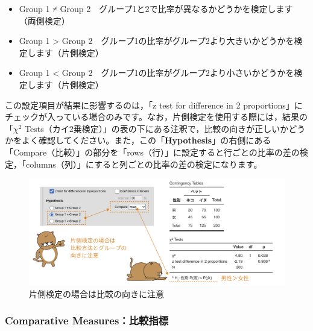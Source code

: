 \documentclass[
  12pt,
  a5jpaper,
  lualatex, ja=standard]{bxjsbook}
\providecommand{\tightlist}{%
  \setlength{\itemsep}{0pt}\setlength{\parskip}{0pt}}
\newenvironment{jmvsettings}{%
	\begin{center}%
	\begin{tcolorbox}[%
		title=設定項目,
		colframe=gmoji,
		colbacktitle=gmoji,
		colback=gmoji!2!white,
		breakable,
		width=.9\textwidth,
		]\small\addtolength{\leftmargini}{-3\labelsep}%
	}%
	{\end{tcolorbox}\end{center}}
\begin{document}
\begin{jmvsettings}

\begin{itemize}
\tightlist
\item
  Group 1 ≠ Group 2　グループ1と2で比率が異なるかどうかを検定します（両側検定）
\item
  Group 1 \textgreater{} Group 2　グループ1の比率がグループ2より大きいかどうかを検定します（片側検定）
\item
  Group 1 \textless{} Group 2　グループ1の比率がグループ2より小さいかどうかを検定します（片側検定）
\end{itemize}

\end{jmvsettings}

この設定項目が結果に影響するのは，「z test for difference in 2 proportions」にチェックが入っている場合のみです。なお，片側検定を使用する際には，結果の「\(\chi^2\) Tests（カイ2乗検定）」の表の下にある注釈で，比較の向きが正しいかどうかをよく確認してください。また，この「\textbf{Hypothesis}」の右側にある「Compare（比較）」の部分を「rows（行）」に設定すると行ごとの比率の差の検定，「columns（列）」にすると列ごとの比率の差の検定になります。

\begin{figure}[!ht]

{\centering \includegraphics[width=1\linewidth]{images/frequencies/chisq-hypothesis} 

}

\caption{片側検定の場合は比較の向きに注意}\label{fig:frequencies-chisq-hypothesis}
\end{figure}

\hypertarget{comparative-measuresux6bd4ux8f03ux6307ux6a19}{%
\subsubsection*{Comparative Measures：比較指標}\label{comparative-measuresux6bd4ux8f03ux6307ux6a19}}
\end{document}
